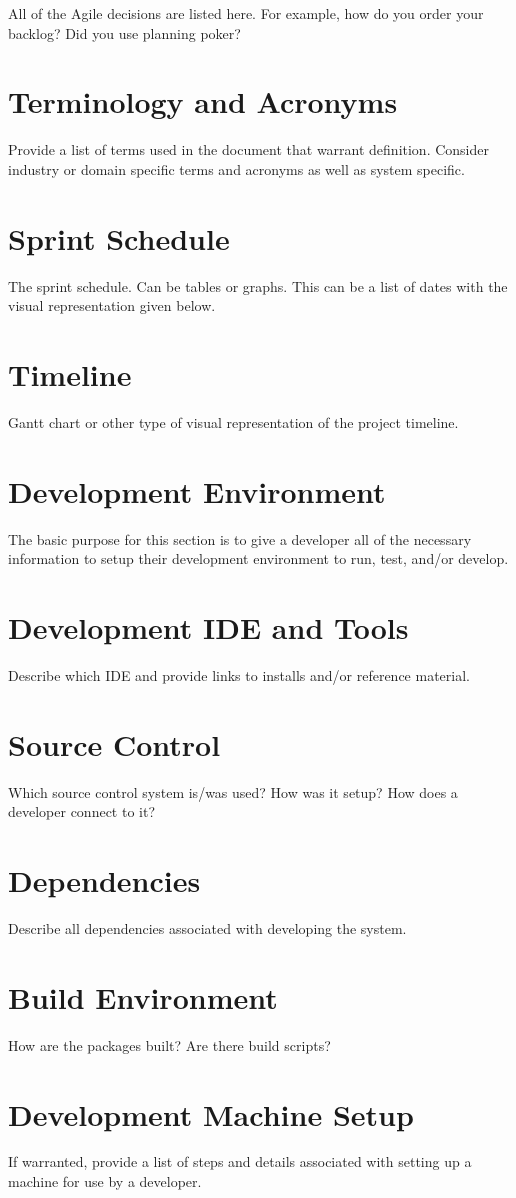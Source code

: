 All of the Agile decisions are listed here.  For example, how do you order your backlog?   
Did you use planning poker?   

\section{Terminology and Acronyms}
Provide a list of terms used in the document that warrant definition.  Consider 
industry or domain specific terms and acronyms as well as system specific. 

\section{Sprint Schedule}
The sprint schedule.  Can be tables or graphs.   This can be a list of dates with the visual 
representation given below.

\section{Timeline}
Gantt chart or other type of visual representation of the project timeline.

\section{Development Environment}
The basic purpose for this section is to give a developer all of the necessary 
information to setup their development environment to run, test, and/or develop. 


\section{Development IDE and Tools}
Describe which IDE and provide links to installs and/or reference material. 

\section{Source  Control}
Which source control system is/was used?  How was it setup?  How does a developer 
connect to it? 

\section{Dependencies}
Describe all dependencies associated with developing the system. 

\section{Build  Environment}
How are the packages built?  Are there build scripts? 

\section{Development Machine Setup}
If warranted, provide a list of steps and details associated with setting up a 
machine for use by a developer. 


